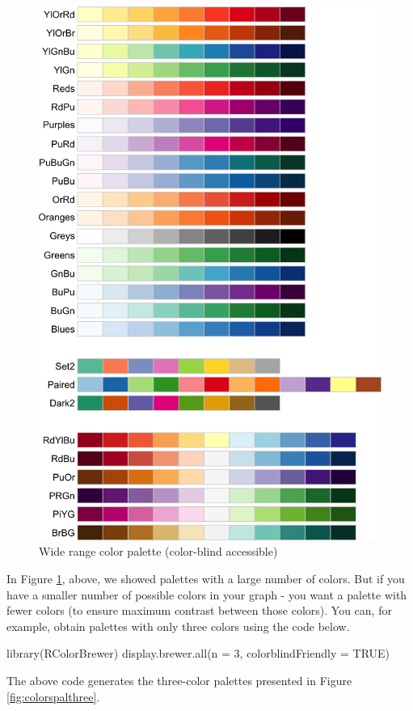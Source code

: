 \documentclass[
]{krantz}
\makeatletter
\newenvironment{Shaded}{\begin{snugshade}}{\end{snugshade}}
\newcommand{\AttributeTok}[1]{\textcolor[rgb]{0.61,0.61,0.61}{#1}}
\newcommand{\ConstantTok}[1]{\textcolor[rgb]{0,0,0}{#1}}
\newcommand{\DecValTok}[1]{\textcolor[rgb]{0.06,0.06,0.06}{#1}}
\newcommand{\FunctionTok}[1]{\textcolor[rgb]{0,0,0}{#1}}
\newcommand{\NormalTok}[1]{#1}
\newenvironment{kframe}{%
\medskip{}
\setlength{\fboxsep}{.8em}
 \def\at@end@of@kframe{}%
 \ifinner\ifhmode%
  \def\at@end@of@kframe{\end{minipage}}%
  \begin{minipage}{\columnwidth}%
 \fi\fi%
 \def\FrameCommand##1{\hskip\@totalleftmargin \hskip-\fboxsep
 \colorbox{shadecolor}{##1}\hskip-\fboxsep
     \hskip-\linewidth \hskip-\@totalleftmargin \hskip\columnwidth}%
 \MakeFramed {\advance\hsize-\width
   \@totalleftmargin\z@ \linewidth\hsize
   \@setminipage}}%
 {\par\unskip\endMakeFramed%
 \at@end@of@kframe}
\renewenvironment{Shaded}{\begin{kframe}}{\end{kframe}}
\makeatother
\begin{document}
\begin{figure}
\includegraphics[width=0.7\linewidth,height=0.7\textheight]{ch_graphing/images/colors_all} \caption{Wide range color palette (color-blind accessible)}\label{fig:colorpal}
\end{figure}

\newpage

In Figure \ref{fig:colorpal}, above, we showed palettes with a large number of colors. But if you have a smaller number of possible colors in your graph - you want a palette with fewer colors (to ensure maximum contrast between those colors). You can, for example, obtain palettes with only three colors using the code below.

\begin{Shaded}
\begin{Highlighting}[]
\FunctionTok{library}\NormalTok{(RColorBrewer)}
\FunctionTok{display.brewer.all}\NormalTok{(}\AttributeTok{n =} \DecValTok{3}\NormalTok{, }\AttributeTok{colorblindFriendly =} \ConstantTok{TRUE}\NormalTok{)}
\end{Highlighting}
\end{Shaded}

The above code generates the three-color palettes presented in Figure \ref{fig:colorspalthree}.
\end{document}
